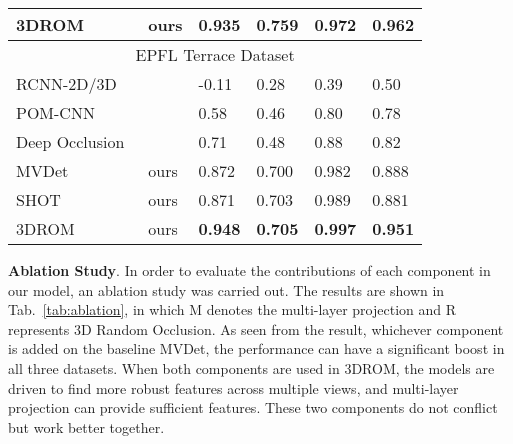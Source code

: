 \documentclass[runningheads]{llncs}
\begin{document}
\begin{table}[t]
\begin{center}
{\begin{tabular}{llllll}
					3DROM   &ours    & \textbf{0.935} & 0.759 & \textbf{0.972}      & \textbf{0.962}   \\ \hline
					\multicolumn{6}{c}{EPFL Terrace Dataset}                                       \\ \hline
					RCNN-2D/3D~\cite{xu2016multi} &\cite{baque2017deep}    & -0.11 & 0.28  & 0.39       & 0.50    \\
					POM-CNN~\cite{baque2017deep}          &\cite{baque2017deep}      & 0.58  & 0.46  & 0.80       & 0.78    \\
Deep Occlusion~\cite{baque2017deep}   &\cite{baque2017deep}      & 0.71  & 0.48  & 0.88       & 0.82    \\
					MVDet~\cite{hou2020multiview}           & ours      & 0.872 & 0.700 & 0.982      & 0.888   \\
					SHOT~\cite{song2021stacked}             &ours &0.871 &0.703	&0.989	&0.881 \\
					3DROM    & ours   & \textbf{0.948} & \textbf{0.705} & \textbf{0.997}      & \textbf{0.951}   \\ \hline
				\end{tabular}
			}
		\end{center}	
	\end{table}
	
	\textbf{Ablation Study}. In order to evaluate the contributions of each component in our model, an ablation study was carried out. The results are shown in Tab.~\ref{tab:ablation}, in which M denotes the multi-layer projection and R represents 3D Random Occlusion. As seen from the result, whichever component is added on the baseline MVDet, the performance can have a significant boost in all three datasets. When both components are used in 3DROM, the models are driven to find more robust features across multiple views, and multi-layer projection can provide sufficient features. These two components do not conflict but work better together.
	
\end{document}
